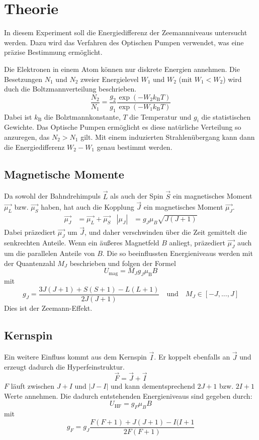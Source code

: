 \section{Theorie}
\label{sec:Theorie}
In diesem Experiment soll die Energiedifferenz der Zeemannniveaus untersucht werden. Dazu wird das Verfahren des Optischen Pumpen verwendet, was eine präzise Bestimmung ermöglicht.

Die Elektronen in einem Atom können nur diskrete Energien annehmen. Die Besetzungen $N_1$ und $N_2$  zweier Energielevel $W_1$ und $W_2$ (mit $W_1<W_2$) wird duch die Boltzmannverteilung beschrieben.
\begin{equation}
	\frac{N_2}{N_1}=\frac{g_2}{g_1}\frac{\exp(-W_2k_\mathrm{B}T)}{\exp(-W_1k_\mathrm{B}T)}
	\label{eqn:Bolztmann}
\end{equation}
Dabei ist $k_\mathrm{B}$ die Bolztmannkonstante, $T$ die Temperatur und $g_i$ die statistischen Gewichte. Das Optische Pumpen ermöglicht es diese natürliche Verteilung so anzuregen, das $N_2 > N_1$ gilt. Mit einem induzierten Strahlenübergang kann dann die Energiedifferenz $W_2-W_1$ genau bestimmt werden.
\subsection{Magnetische Momente}
Da sowohl der Bahndrehimpuls $\vec{L}$ als auch der Spin $\vec{S}$ ein magnetisches Moment $\vec{\mu_L}$ bzw. $\vec{\mu_S}$ haben, hat auch die Kopplung $\vec{J}$ ein magnetisches Moment $\vec{\mu_J}$.
\begin{align}
	\vec{\mu_J}&=\vec{\mu_L} +\vec{\mu_S} & \left| \mu_J \right|&=g_J\mu_B\sqrt{J(J+1)}
\end{align}
Dabei präzediert $\vec{\mu_J}$ um $\vec{J}$, und daher verschwinden über die Zeit gemittelt die senkrechten Anteile.
Wenn ein äußeres Magnetfeld $B$ anliegt, präzediert $\vec{\mu_J}$ auch um die parallelen Anteile von $B$. Die so beeinflussten Energieniveaus werden mit der Quantenzahl $M_J$ beschrieben und folgen der Formel
\begin{equation}
	U_\mathrm{mag} = M_J g_J \mu_\mathrm{B}B
\end{equation}
mit
\begin{equation}
	g_J=\frac{3J(J+1)+S(S+1)-L(L+1)}{2J(J+1)} \quad \text{und}\quad M_J \in [-J,...,J]
\end{equation}
Dies ist der Zeemann-Effekt.
\subsection{Kernspin}
Ein weitere Einfluss kommt aus dem Kernspin $\vec{I}$. Er koppelt ebenfalls an $\vec{J}$ und erzeugt dadurch die Hyperfeinstruktur.
\begin{equation}
	\vec{F}=\vec{J} +\vec{I}
\end{equation}
$F$ läuft zwischen $J+I$ und $|J-I|$ und kann dementsprechend $2J+1$ bzw. $2I+1$ Werte annehmen. Die dadurch entstehenden Energieniveaus sind gegeben durch:
\begin{equation}
	U_\mathrm{HF}=g_F\mu_BB
\end{equation}
mit
\begin{equation}
	g_F=g_J\frac{F(F+1)+J(J+1)-I(I+1}{2F(F+1)}
	\label{eqn:g_F}
\end{equation}
